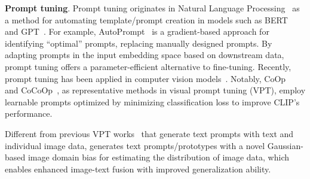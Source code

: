 \noindent
\textbf{Prompt tuning}. 
Prompt tuning originates in Natural Language Processing~\cite{lester_power_2021,li_prefix-tuning_2021,shin_autoprompt_2020} as a method for automating template/prompt creation in models such as BERT~\cite{devlinBERTPretrainingDeep2019} and GPT~\cite{openai_gpt-4_2023}. 
For example, AutoPrompt~\cite{shin_autoprompt_2020} is a gradient-based approach for identifying ``optimal'' prompts, replacing manually designed prompts. 
By adapting prompts in the input embedding space based on downstream data, prompt tuning offers a parameter-efficient alternative to fine-tuning.
Recently, prompt tuning has been applied in computer vision models~\cite{khattak_self-regulating_2023,zhou2022cocoop,zhou_learning_2022}.
Notably, CoOp~\cite{zhou_learning_2022} and CoCoOp~\cite{zhou2022cocoop}, as representative methods in visual prompt tuning (VPT), employ learnable prompts optimized by minimizing classification loss to improve CLIP's performance. 

Different from previous VPT works~\cite{zhou2022cocoop,zhou_learning_2022,miyai_locoop_2023,liu_category-extensible_2023,bai_id-like_2024,nie_out--distribution_2024} that generate text prompts with text and individual image data, \ours generates text prompts/prototypes with a novel Gaussian-based image domain bias for estimating the distribution of image data, which enables enhanced image-text fusion with improved generalization ability.
